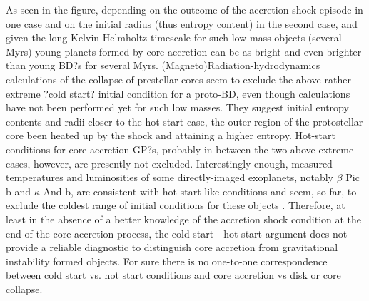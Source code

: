 As seen in the figure, depending on the outcome of the accretion shock episode in one case and on the initial 
radius (thus entropy content) in the second case, and given the
long Kelvin-Helmholtz timescale for such low-mass objects (several Myrs) young planets formed by core accretion can
be as bright and even brighter than young BD?s for several Myrs. (Magneto)Radiation-hydrodynamics calculations of
the collapse of prestellar cores \citep{Tomida2013, Vaytet2013} seem to exclude the above rather extreme 
?cold start? initial condition for a proto-BD, even though calculations have not been performed yet for such low masses.
They suggest initial entropy contents and radii closer to the hot-start case, the outer region of the protostellar core been
heated up by the shock and attaining a higher entropy. Hot-start conditions for core-accretion GP?s, probably in between 
the two above extreme cases, however, are presently not excluded. Interestingly enough, measured temperatures
and luminosities of some directly-imaged exoplanets, notably $\beta$ Pic b and $\kappa$ And b, are consistent with hot-start like
conditions and seem, so far, to exclude the coldest range of initial conditions for these objects \citep{Currie2013,
Marleau2013}. Therefore, at least in the absence of a better knowledge of the accretion shock 
condition at the end of the core accretion process, the cold start - hot start argument does not provide a reliable diagnostic
to distinguish core accretion from gravitational instability formed objects. 
For sure there is no one-to-one correspondence between cold start vs. hot
start conditions and core accretion vs disk or core collapse.

